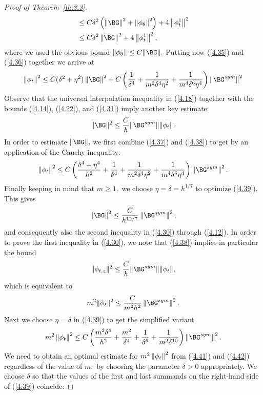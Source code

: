 \begin{proof}[Proof of Theorem~{\ref{th:3.3}}]
\begin{align}
&\leq C\delta^2\left(\norm{\BG}^2+\norm{\phi_\theta}^2\right)+4\norm{\phi^1_t}^2\\ \nonumber
&\leq C\delta^2 \norm{\BG}^2+4\norm{\phi^1_t}^2,
\end{align}
where we used the obvious bound $\|\phi_\Gth\|\leq C\|\BG\|.$
Putting now (\ref{4.35}) and (\ref{4.36}) together we arrive at 
\begin{equation}
\label{4.37}
\norm{\phi_t}^2\leq C (\delta^2+\eta^2)\norm{\BG}^2+C\left(\frac{1}{\delta^4}+\frac{1}{m^2\delta^4 \eta^2}+
 \frac{1}{m^4\delta^6\eta^4}\right)\norm{\BG^{sym}}^2
\end{equation}
Observe that the universal interpolation inequality in (\ref{4.18}) together with the bounds (\ref{4.14}), (\ref{4.22}), and (\ref{4.31}) imply another key estimate: 
\begin{equation}
\label{4.38}
\|\BG\|^2\leq\frac{C}{h}\|\BG^{sym}\|\|\phi_t\|.
\end{equation}
In order to estimate $\|\BG\|,$ we first combine (\ref{4.37}) and (\ref{4.38}) to get by an application of the Cauchy inequality:
\begin{equation}
\label{4.39}
\norm{\phi_t}^2\leq C \left(\frac{\delta^4+\eta^4}{h^2}+\frac{1}{\delta^4}+\frac{1}{m^2 \delta^4 \eta^2}+
 \frac{1}{m^4\delta^6\eta^4}\right)\norm{\BG^{sym}}^2.
\end{equation}
Finally keeping in mind that $m\geq 1,$ we choose $\eta=\delta=h^{1/7}$ to optimize (\ref{4.39}). This gives 
\begin{equation}
\label{4.40}
\norm{\BG}^2\leq \frac{C}{h^{12/7}}\norm{\BG^{sym}}^2,
\end{equation}
and consequently also the second inequality in (\ref{4.30}) through (\ref{4.12}). In order to prove the first inequality in (\ref{4.30}), we note that (\ref{4.38}) implies in particular the bound 
$$\|\phi_{t,z}\|^2\leq \frac{C}{h}\|\BG^{sym}\|\|\phi_t\|,$$
which is equivalent to
\begin{equation}
\label{4.41}
m^2\|\phi_t\|^2 \leq \frac{C}{m^2h^2}\norm{\BG^{sym}}^2.
\end{equation}
Next we choose $\eta=\delta$ in (\ref{4.39}) to get the simplified variant 
\begin{equation}
\label{4.42}
m^2\norm{\phi_t}^2\leq C \left(\frac{m^2\delta^4}{h^2}+\frac{m^2}{\delta^4}+\frac{1}{\delta^6}+
 \frac{1}{m^2\delta^{10}}\right)\norm{\BG^{sym}}^2.
\end{equation}
We need to obtain an optimal estimate for $m^2\left\lVert \phi_t \right\rVert^2$ from (\ref{4.41}) and (\ref{4.42}) regardless of the value of $m,$ by choosing the parameter $\delta>0$ appropriately. We choose $\delta$ so that the values of the first and last summands on the right-hand side of (\ref{4.39}) coincide: 

\end{proof}
